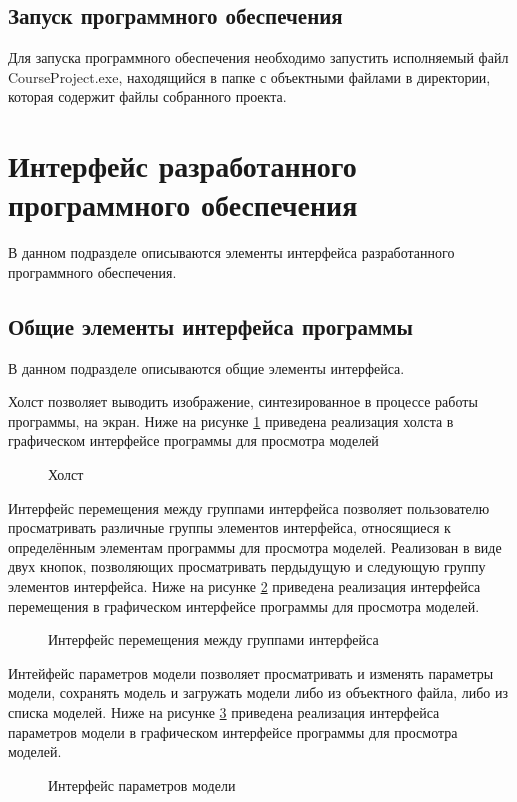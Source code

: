 \subsection{Запуск программного обеспечения}
Для запуска программного обеспечения необходимо запустить исполняемый файл CourseProject.exe, находящийся в папке с объектными файлами в директории, которая содержит файлы собранного проекта.

\section{Интерфейс разработанного программного обеспечения}
В данном подразделе описываются элементы интерфейса разработанного программного обеспечения.
\subsection{Общие элементы интерфейса программы}
В данном подразделе описываются общие элементы интерфейса.

Холст позволяет выводить изображение, синтезированное в процессе работы программы, на экран. Ниже на рисунке \ref{fig:screen}  приведена реализация холста в графическом интерфейсе программы для просмотра моделей
\begin{figure}[H]
	\caption{Холст}
	\label{fig:screen}
\end{figure}

Интерфейс перемещения между группами интерфейса позволяет пользователю просматривать различные группы элементов интерфейса, относящиеся к определённым элементам программы для просмотра моделей. Реализован в виде двух кнопок, позволяющих просматривать пердыдущую и следующую группу элементов интерфейса. Ниже на рисунке \ref{fig:arrows} приведена реализация интерфейса перемещения в графическом интерфейсе программы для просмотра моделей.
\begin{figure}[H]
	\caption{Интерфейс перемещения между группами интерфейса}
	\label{fig:arrows}
\end{figure}

Интейфейс параметров модели позволяет просматривать и изменять параметры модели, сохранять модель и загружать модели либо из объектного файла, либо из списка моделей. Ниже на рисунке \ref{fig:model_params} приведена реализация интерфейса параметров модели в графическом интерфейсе программы для просмотра моделей.
\begin{figure}[H]
	\caption{Интерфейс параметров модели}
	\label{fig:model_params}
\end{figure}


